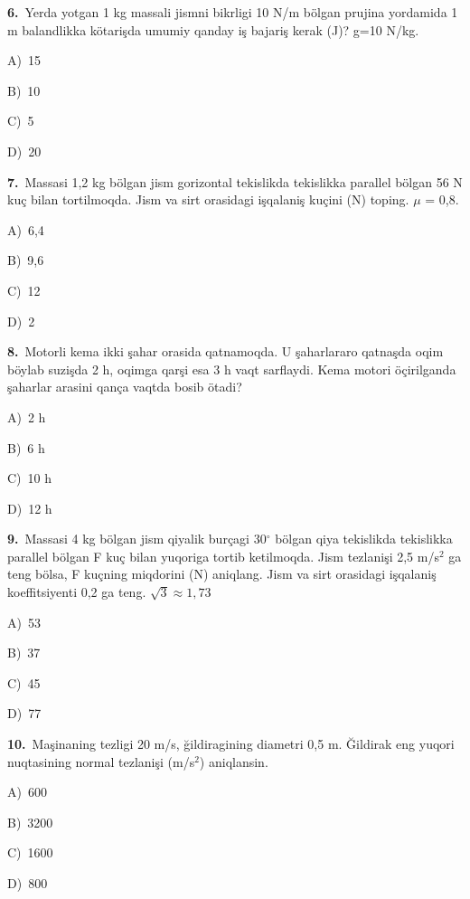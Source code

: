 \documentclass[11pt,a4paper]{article}
\newcommand{\opt}[2]{\hspace*{4mm}#1)\ #2\par}
\begin{document}
\noindent\begin{minipage}{\linewidth}
\textbf{6.}\ Yerda yotgan 1 kg massali jismni bikrligi 10 N/m bölgan prujina yordamida 1 m balandlikka kötarişda umumiy qanday iş bajariş kerak (J)? g=10 N/kg.\par\smallskip
\opt{A}{15}
\opt{B}{10}
\opt{C}{5}
\opt{D}{20}
\end{minipage}\vspace{9pt}\par
\noindent\begin{minipage}{\linewidth}
\textbf{7.}\ Massasi 1,2 kg bölgan jism gorizontal tekislikda tekislikka parallel bölgan 56 N kuç bilan tortilmoqda. Jism va sirt orasidagi işqalaniş kuçini (N) toping. $\mu$ = 0,8.\par\smallskip
\opt{A}{6,4}
\opt{B}{9,6}
\opt{C}{12}
\opt{D}{2}
\end{minipage}\vspace{9pt}\par
\noindent\begin{minipage}{\linewidth}
\textbf{8.}\ Motorli kema ikki şahar orasida qatnamoqda. U şaharlararo qatnaşda oqim böylab suzişda 2 h, oqimga qarşi esa 3 h vaqt sarflaydi. Kema motori öçirilganda şaharlar arasini qança vaqtda bosib ötadi?\par\smallskip
\opt{A}{2 h}
\opt{B}{6 h}
\opt{C}{10 h}
\opt{D}{12 h}
\end{minipage}\vspace{9pt}\par
\noindent\begin{minipage}{\linewidth}
\textbf{9.}\ Massasi 4 kg bölgan jism qiyalik burçagi 30$^\circ$ bölgan qiya tekislikda tekislikka parallel bölgan F kuç bilan yuqoriga tortib ketilmoqda. Jism tezlanişi 2,5 m/s$^{2}$ ga teng bölsa, F kuçning miqdorini (N) aniqlang. Jism va sirt orasidagi işqalaniş koeffitsiyenti 0,2 ga teng. $\sqrt{3} \approx 1{,}73$\par\smallskip
\opt{A}{53}
\opt{B}{37}
\opt{C}{45}
\opt{D}{77}
\end{minipage}\vspace{9pt}\par
\noindent\begin{minipage}{\linewidth}
\textbf{10.}\ Maşinaning tezligi 20 m/s, ğildiragining diametri 0,5 m. Ğildirak eng yuqori nuqtasining normal tezlanişi (m/s$^{2}$) aniqlansin.\par\smallskip
\opt{A}{600}
\opt{B}{3200}
\opt{C}{1600}
\opt{D}{800}
\end{minipage}\vspace{9pt}\par
\end{document}
